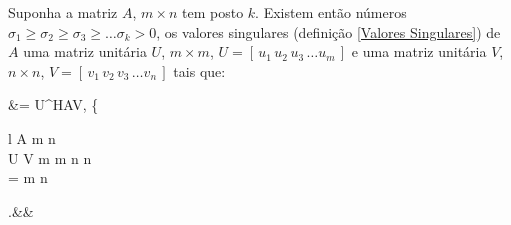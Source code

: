 \documentclass[10pt,a4paper]{article}
\begin{document}
\begin{theorem}
	Suponha a matriz $A$, $m \times n$ tem posto $k$. Existem então números $\sigma_1 \geq \sigma_2 \geq \sigma_3 \geq \dots \sigma_k > 0$, os valores singulares (definição \ref{Valores Singulares}) de $A$ uma matriz unitária $U$, $m \times m$, $U = [ \, u_1 \, u_2 \, u_3 \, \dots u_m \, ]$ e uma matriz unitária $V$, $n \times n$, $V = [ \, v_1 \, v_2 \, v_3 \, \dots v_n \, ]$ tais que:
	\begin{flalign*}
		&\Sigma = U^HAV,  \left\{\begin{array}{l}
			A  m \times n\\
			U  V  m \times m  n \times n \\
			\Sigma =   m \times n
		\end{array}\right.&&
	\end{flalign*}
\end{theorem}
\end{document}
